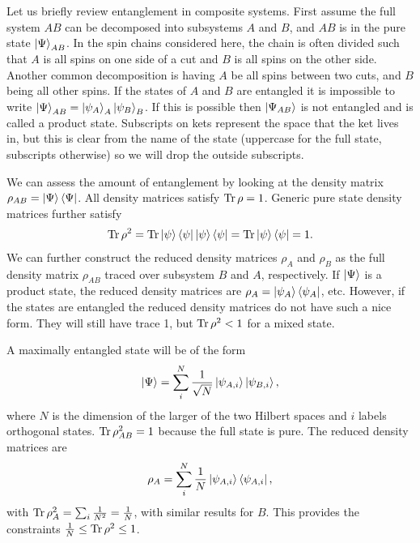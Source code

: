 Let us briefly review entanglement in composite systems. First assume the full system $AB$ can be decomposed into subsystems $A$ and $B$, and $AB$ is in the pure state $\left|\Psi\right\rangle_{{AB}}$. In the spin chains considered here, the chain is often divided such that $A$ is all spins on one side of a cut and $B$ is all spins on the other side. Another common decomposition is having $A$ be all spins between two cuts, and $B$ being all other spins. If the states of $A$ and $B$ are entangled it is impossible to write $\left|\Psi\right\rangle_{AB} = \left|\psi_A\right\rangle_A \left|\psi_B\right\rangle_B$. If this is possible then $\left|\Psi_{{AB}}\right\rangle$ is not entangled and is called a product state. Subscripts on kets represent the space that the ket lives in, but this is clear from the name of the state (uppercase for the full state, subscripts otherwise) so we will drop the outside subscripts.

We can assess the amount of entanglement by looking at the density matrix $\rho_{AB} = \left|\Psi\right\rangle\left\langle\Psi\right|$. All density matrices satisfy $\operatorname{Tr} \rho = 1$. Generic pure state density matrices further satisfy 
\begin{align}
\operatorname{Tr} \rho^2 = \operatorname{Tr}\left|\psi\right\rangle\left\langle\psi\right|\left|\psi\right\rangle\left\langle\psi\right| = \operatorname{Tr}\left|\psi\right\rangle\left\langle\psi\right| = 1.
\end{align}
We can further construct the reduced density matrices $\rho_A$ and $\rho_B$ as the full density matrix $\rho_{AB}$ traced over subsystem $B$ and $A$, respectively. If $\left|\Psi\right\rangle$ is a product state, the reduced density matrices are $\rho_A = \left|\psi_A\right\rangle\left\langle\psi_A\right|$, etc. However, if the states are entangled the reduced density matrices do not have such a nice form. They will still have trace 1, but $\operatorname{Tr}\rho^2<1$ for a mixed state.

A maximally entangled state will be of the form
\begin{align}
\left|\Psi\right\rangle = \sum_i^N\frac{1}{\sqrt{N}}\left|\psi_{A,i}\right\rangle\left|\psi_{B,i}\right\rangle,
\end{align}
where $N$ is the dimension of the larger of the two Hilbert spaces and $i$ labels orthogonal states. $\operatorname{Tr}\rho_{AB}^2=1$ because the full state is pure. The reduced density matrices are
\begin{align}
\rho_A = \sum_i^N\frac{1}{N}\left|\psi_{A,i}\right\rangle\left\langle\psi_{A,i}\right|,
\end{align}
with $\operatorname{Tr}\rho_A^2 = \sum_i\frac{1}{N^2}=\frac{1}{N}$, with similar results for $B$. This provides the constraints $\frac{1}{N}\le\operatorname{Tr}\rho^2\le 1$. 

